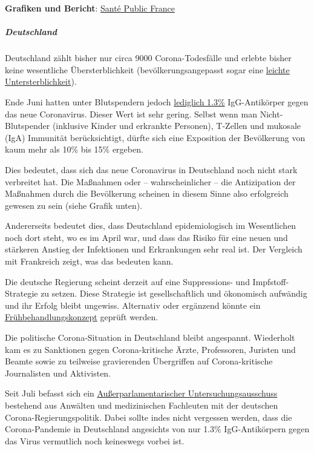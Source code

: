 \textbf{Grafiken und Bericht}:
\href{https://www.santepubliquefrance.fr/maladies-et-traumatismes/maladies-et-infections-respiratoires/infection-a-coronavirus/documents/rapport-synthese/surveillance-de-la-mortalite-au-cours-de-l-epidemie-de-covid-19-du-2-mars-au-31-mai-2020-en-france}{Santé
Public France}

\hypertarget{deutschland}{%
\subparagraph{\texorpdfstring{\textbf{Deutschland}}{Deutschland}}\label{deutschland}}

Deutschland zählt bisher nur circa 9000 Corona-Todesfälle und erlebte
bisher keine wesentliche Übersterblichkeit (bevölkerungsangepasst sogar
eine
\href{https://swprs.files.wordpress.com/2020/06/breyer-deutschland-untersterblichkeit.pdf}{leichte
Untersterblichkeit}).

Ende Juni hatten unter Blutspendern jedoch
\href{https://www.rki.de/DE/Content/InfAZ/N/Neuartiges_Coronavirus/Projekte_RKI/SeBluCo_Zwischenbericht.html}{lediglich
1.3\%} IgG-Antikörper gegen das neue Coronavirus. Dieser Wert ist sehr
gering. Selbst wenn man Nicht-Blutspender (inklusive Kinder und
erkrankte Personen), T-Zellen und mukosale (IgA) Immunität
berücksichtigt, dürfte sich eine Exposition der Bevölkerung von kaum
mehr als 10\% bis 15\% ergeben.

Dies bedeutet, dass sich das neue Coronavirus in Deutschland noch nicht
stark verbreitet hat. Die Maßnahmen oder -- wahrscheinlicher -- die
Antizipation der Maßnahmen durch die Bevölkerung scheinen in diesem
Sinne also erfolgreich gewesen zu sein (siehe Grafik unten).

Andererseits bedeutet dies, dass Deutschland epidemiologisch im
Wesentlichen noch dort steht, wo es im April war, und dass das Risiko
für eine neuen und stärkeren Anstieg der Infektionen und Erkrankungen
sehr real ist. Der Vergleich mit Frankreich zeigt, was das bedeuten
kann.

Die deutsche Regierung scheint derzeit auf eine Suppressions- und
Impfstoff-Strategie zu setzen. Diese Strategie ist gesellschaftlich und
ökonomisch aufwändig und ihr Erfolg bleibt ungewiss. Alternativ oder
ergänzend könnte ein
\href{https://swprs.org/zur-behandlung-von-covid-19/}{Frühbehandlungskonzept}
geprüft werden.

Die politische Corona-Situation in Deutschland bleibt angespannt.
Wiederholt kam es zu Sanktionen gegen Corona-kritische Ärzte,
Professoren, Juristen und Beamte sowie zu teilweise gravierenden
Übergriffen auf Corona-kritische Journalisten und Aktivisten.

Seit Juli befasst sich ein
\href{https://corona-ausschuss.de/}{Außer­parlamen­tarischer
Untersuchungs­­ausschuss} bestehend aus Anwälten und medizinischen
Fachleuten mit der deutschen Corona-Regierungspolitik. Dabei sollte
indes nicht vergessen werden, dass die Corona-Pandemie in Deutschland
angesichts von nur 1.3\% IgG-Antikörpern gegen das Virus vermutlich noch
keineswegs vorbei ist.


